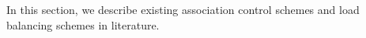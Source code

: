 






In this section, we describe existing association control schemes and load balancing schemes in literature.

